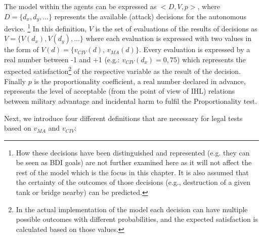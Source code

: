 The model within the agents can be expressed as $<D,V,p>$, where $D = \{d_x, d_y, ...\}$ represents the available (attack) decisions for the autonomous device. \footnote{How these decisions have been distinguished and represented (e.g. they can be seen as BDI goals) are not further examined here as it will not affect the rest of the model which is the focus in this chapter. It is also assumed that the certainty of the outcomes of those decisions (e.g., destruction of a given tank or bridge nearby) can be predicted.} In this definition, $V$ is the set of evaluations of the results of decisions as $V=\{V(d_x),V(d_y),...\}$ where each evaluation is expressed with two values in the form of $V(d)=\{v_{CIV}(d)$, $v_{MA}(d)\}$. Every evaluation is expressed by a real number between -1 and +1 (e.g.: $v_{CIV}(d_x) = 0,75$) which represents the expected satisfaction\footnote{In the actual implementation of the model each decision can have multiple possible outcomes with different probabilities, and the expected satisfaction is calculated based on those values.} of the respective variable as the result of the decision. Finally $p$ is the proportionality coefficient, a real number declared in advance, represents the level of acceptable (from the point of view of IHL) relations between military advantage and incidental harm to fulfil the Proportionality test.

Next, we introduce four different definitions that are necessary for legal tests based  on $v_{MA}$ and $v_{CIV}$:

